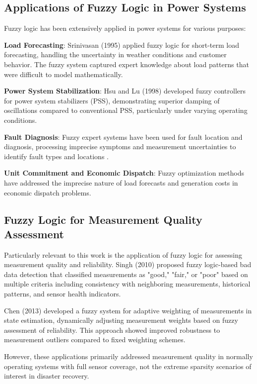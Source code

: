 \documentclass[12pt,a4paper]{report}
\begin{document}
\subsection{Applications of Fuzzy Logic in Power Systems}

Fuzzy logic has been extensively applied in power systems for various purposes:

\textbf{Load Forecasting}: Srinivasan (1995) applied fuzzy logic for short-term load forecasting, handling the uncertainty in weather conditions and customer behavior. The fuzzy system captured expert knowledge about load patterns that were difficult to model mathematically.

\textbf{Power System Stabilization}: Hsu and Lu (1998) developed fuzzy controllers for power system stabilizers (PSS), demonstrating superior damping of oscillations compared to conventional PSS, particularly under varying operating conditions.

\textbf{Fault Diagnosis}: Fuzzy expert systems have been used for fault location and diagnosis, processing imprecise symptoms and measurement uncertainties to identify fault types and locations \cite{cardoso1993}.

\textbf{Unit Commitment and Economic Dispatch}: Fuzzy optimization methods have addressed the imprecise nature of load forecasts and generation costs in economic dispatch problems.

\subsection{Fuzzy Logic for Measurement Quality Assessment}

Particularly relevant to this work is the application of fuzzy logic for assessing measurement quality and reliability. Singh (2010) proposed fuzzy logic-based bad data detection that classified measurements as "good," "fair," or "poor" based on multiple criteria including consistency with neighboring measurements, historical patterns, and sensor health indicators.

Chen (2013) developed a fuzzy system for adaptive weighting of measurements in state estimation, dynamically adjusting measurement weights based on fuzzy assessment of reliability. This approach showed improved robustness to measurement outliers compared to fixed weighting schemes.

However, these applications primarily addressed measurement quality in normally operating systems with full sensor coverage, not the extreme sparsity scenarios of interest in disaster recovery.
\end{document}
